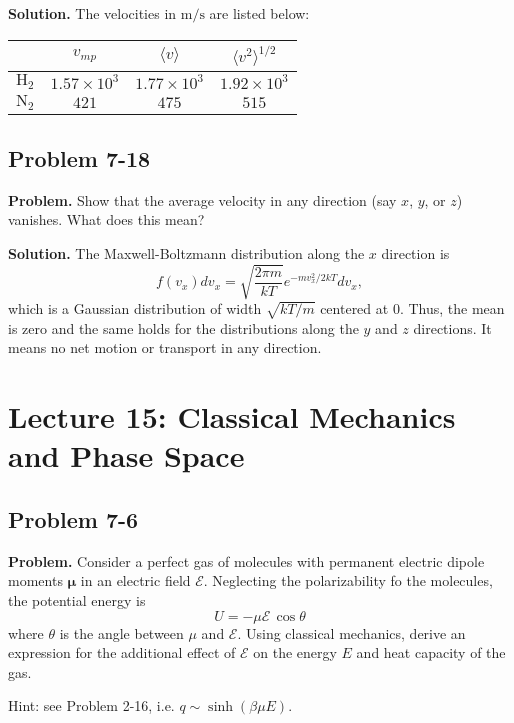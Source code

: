 \documentclass[twocolumn, 10pt]{article}
\numberwithin{equation}{section}
\newenvironment{problem}
{\par\medskip\sffamily \color{problue}
  \textbf{Problem. }\ignorespaces}
{\medskip}
\newenvironment{solution}
{\par\medskip
  \textbf{Solution. }\ignorespaces}
{\medskip}
\begin{document}
\begin{solution}
The velocities in $\mathrm{m/s}$ are listed below:
\begin{table}[h]
\begin{tabular}{c | c c c}
  \hline \hline
  & $v_{mp}$  & $\langle v \rangle$ & $\langle v^2 \rangle^{1/2}$\\
  \hline
  $\mathrm H_2$ &
  $1.57\times10^3$ &
  $1.77\times10^3$ &
  $1.92\times10^3$\\
  $\mathrm N_2$ &
  $421$ &
  $475$ &
  $515$ \\
  \hline \hline
\end{tabular}
\end{table}
\end{solution}

\subsection{Problem 7-18}

\begin{problem}
  Show that the average velocity in any direction
  (say $x$, $y$, or $z$) vanishes.
  What does this mean?
\end{problem}

\begin{solution}
  [Due to Dr. Pettitt.]
  The Maxwell-Boltzmann distribution along the $x$ direction is
  $$
  f(v_x) d v_x = \sqrt{\frac{2\pi m }{kT}} e^{-m v_x^2/2kT} d v_x,
  $$
  which is a Gaussian distribution of width $\sqrt{kT/m}$
  centered at $0$.
  Thus, the mean is zero
  and the same holds for the distributions
  along the $y$ and $z$ directions.
  It means no net motion or transport in any direction.
\end{solution}

\section{Lecture 15: Classical Mechanics and Phase Space}

\subsection{Problem 7-6}

\begin{problem}
  Consider a perfect gas of molecules
  with permanent electric dipole moments $\boldsymbol \mu$
  in an electric field $\mathscr E$.
  Neglecting the polarizability fo the molecules,
  the potential energy is
  $$
  U = -\mu \mathscr E \, \cos\theta
  $$
  where $\theta$ is the angle between $\mu$
  and $\mathscr E$.
  Using classical mechanics,
  derive an expression for the additional effect of $\mathscr E$
  on the energy $E$ and heat capacity of the gas.

  Hint: see Problem 2-16, i.e. $q \sim \sinh(\beta \mu E)$.
\end{problem}
\end{document}
